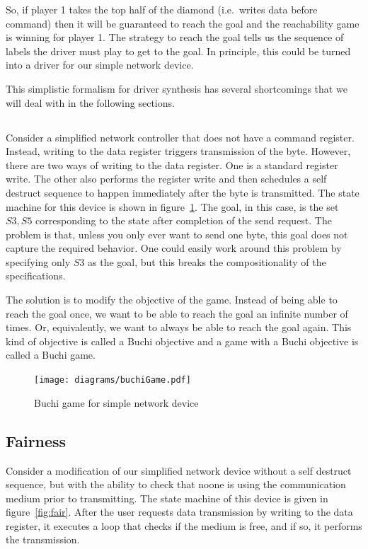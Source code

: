 So, if player 1 takes the top half of the diamond (i.e.\ writes data before command) then it will be guaranteed to reach the goal and the reachability game is winning for player 1. The strategy to reach the goal tells us the sequence of labels the driver must play to get to the goal. In principle, this could be turned into a driver for our simple network device.

This simplistic formalism for driver synthesis has several shortcomings that we will deal with in the following sections.

\subsection{\buchi}

Consider a simplified network controller that does not have a command register. Instead, writing to the data register triggers transmission of the byte. However, there are two ways of writing to the data register. One is a standard register write. The other also performs the register write and then schedules a self destruct sequence to happen immediately after the byte is transmitted. The state machine for this device is shown in figure~\ref{fig:buchi}. The goal, in this case, is the set ${S3, S5}$ corresponding to the state after completion of the send request. The problem is that, unless you only ever want to send one byte, this goal does not capture the required behavior. One could easily work around this problem by specifying only ${S3}$ as the goal, but this breaks the compositionality of the specifications.

The solution is to modify the objective of the game. Instead of being able to reach the goal once, we want to be able to reach the goal an infinite number of times. Or, equivalently, we want to always be able to reach the goal again. This kind of objective is called a Buchi objective and a game with a Buchi objective is called a Buchi game. 

\begin{figure}
\centering
\texttt{[image: diagrams/buchiGame.pdf]}
\caption{Buchi game for simple network device}
\label{fig:buchi}
\end{figure}

\subsection{Fairness}

Consider a modification of our simplified network device without a self destruct sequence, but with the ability to check that noone is using the communication medium prior to transmitting. The state machine of this device is given in figure~\ref{fig:fair}. After the user requests data transmission by writing to the data register, it executes a loop that checks if the medium is free, and if so, it performs the transmission. 

